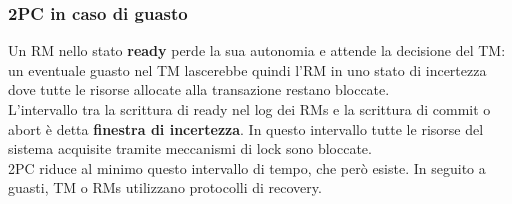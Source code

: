 \subsubsection{2PC in caso di guasto}
Un RM nello stato \textbf{ready} perde la sua autonomia e attende la decisione del TM: un eventuale guasto nel TM lascerebbe quindi l’RM in uno stato di incertezza dove tutte le risorse allocate alla transazione restano bloccate. \\
L’intervallo tra la scrittura di ready nel log dei RMs e la scrittura di commit o abort è detta \textbf{finestra di incertezza}. In questo intervallo tutte le risorse del sistema acquisite tramite meccanismi di lock sono bloccate. \\
2PC riduce al minimo questo intervallo di tempo, che però esiste. In seguito a guasti, TM o RMs utilizzano protocolli di recovery.

